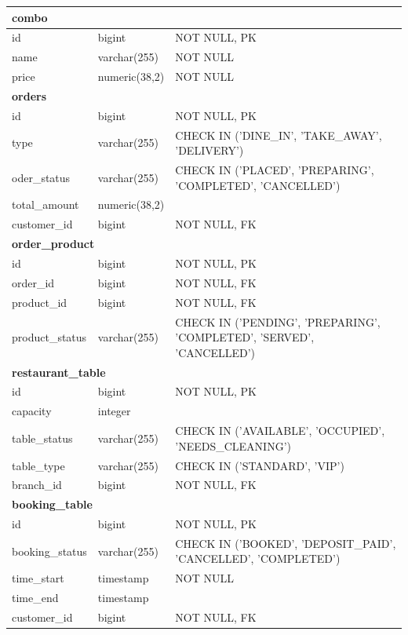 \begin{longtable}{|p{3.5cm}|p{3.5cm}|p{7.5cm}|}
\multicolumn{3}{|l|}{\textbf{combo}} \\
\hline
id & bigint & NOT NULL, PK \\
name & varchar(255) & NOT NULL \\
price & numeric(38,2) & NOT NULL \\
\hline

\multicolumn{3}{|l|}{\textbf{orders}} \\
\hline
id & bigint & NOT NULL, PK \\
type & varchar(255) & CHECK IN ('DINE\_IN', 'TAKE\_AWAY', 'DELIVERY') \\
oder\_status & varchar(255) & CHECK IN ('PLACED', 'PREPARING', 'COMPLETED', 'CANCELLED') \\
total\_amount & numeric(38,2) & \\
customer\_id & bigint & NOT NULL, FK \\
\hline

\multicolumn{3}{|l|}{\textbf{order\_product}} \\
\hline
id & bigint & NOT NULL, PK \\
order\_id & bigint & NOT NULL, FK \\
product\_id & bigint & NOT NULL, FK \\
product\_status & varchar(255) & CHECK IN ('PENDING', 'PREPARING', 'COMPLETED', 'SERVED', 'CANCELLED') \\
\hline

\multicolumn{3}{|l|}{\textbf{restaurant\_table}} \\
\hline
id & bigint & NOT NULL, PK \\
capacity & integer & \\
table\_status & varchar(255) & CHECK IN ('AVAILABLE', 'OCCUPIED', 'NEEDS\_CLEANING') \\
table\_type & varchar(255) & CHECK IN ('STANDARD', 'VIP') \\
branch\_id & bigint & NOT NULL, FK \\
\hline

\multicolumn{3}{|l|}{\textbf{booking\_table}} \\
\hline
id & bigint & NOT NULL, PK \\
booking\_status & varchar(255) & CHECK IN ('BOOKED', 'DEPOSIT\_PAID', 'CANCELLED', 'COMPLETED') \\
time\_start & timestamp & NOT NULL \\
time\_end & timestamp & \\
customer\_id & bigint & NOT NULL, FK \\
\hline


\end{longtable}
